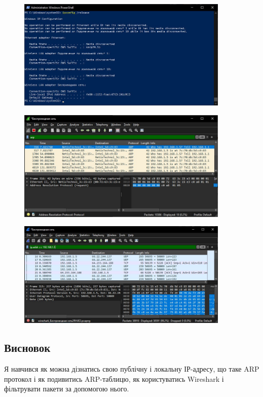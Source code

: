 \documentclass[12pt]{extarticle}
\begin{document}
\begin{figure}[H]
    \centering
    \includegraphics[width=0.90\textwidth]{release.jpg}
    \caption{}
\end{figure}
\begin{figure}[H]
    \centering
    \includegraphics[width=0.90\textwidth]{arp.jpg}
    \caption{}
\end{figure}
\begin{figure}[H]
    \centering
    \includegraphics[width=0.90\textwidth]{ip_search.jpg}
    \caption{}
\end{figure}
\vspace{12pt}

\subsection*{Висновок} 
Я навчився як можна дізнатись свою публічну і локальну ІР-адресу,
що таке ARP протокол і як подивитись ARP-таблицю, як користуватись
Wireshark і фільтрувати пакети за допомогою нього.
\end{document}
